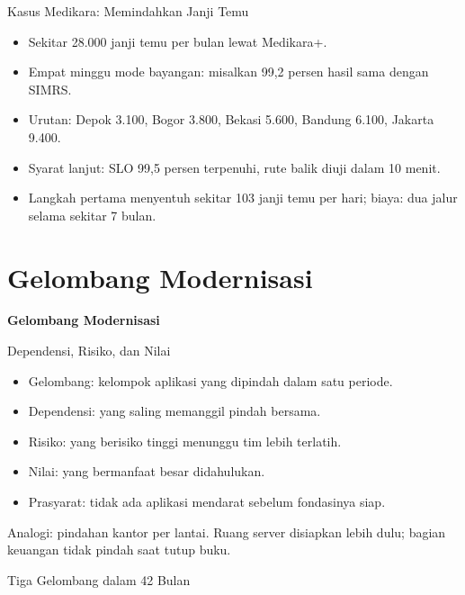 \documentclass[aspectratio=169, table, 12pt]{beamer}
\begin{document}
\begin{frame}{{\Large Kasus Medikara: Memindahkan Janji Temu}}
  \vspace{10pt}
  \begin{itemize}
    \item Sekitar 28.000 janji temu per bulan lewat Medikara+.
    \item Empat minggu mode bayangan: misalkan 99,2 persen hasil sama dengan SIMRS.
    \item Urutan: Depok 3.100, Bogor 3.800, Bekasi 5.600, Bandung 6.100, Jakarta 9.400.
    \item Syarat lanjut: SLO 99,5 persen terpenuhi, rute balik diuji dalam 10 menit.
    \item Langkah pertama menyentuh sekitar 103 janji temu per hari; biaya: dua jalur selama sekitar
          7 bulan.
  \end{itemize}
\end{frame}

\section{Gelombang Modernisasi}

\begin{frame}{\hfill}
  \centering
  \Huge{\textbf{Gelombang Modernisasi}}
\end{frame}

\begin{frame}{{\Large Dependensi, Risiko, dan Nilai}}
  \vspace{10pt}
  \begin{itemize}
    \item Gelombang: kelompok aplikasi yang dipindah dalam satu periode.
    \item Dependensi: yang saling memanggil pindah bersama.
    \item Risiko: yang berisiko tinggi menunggu tim lebih terlatih.
    \item Nilai: yang bermanfaat besar didahulukan.
    \item Prasyarat: tidak ada aplikasi mendarat sebelum fondasinya siap.
  \end{itemize}
  \vspace{6pt}
  {\small Analogi: pindahan kantor per lantai. Ruang server disiapkan lebih dulu; bagian keuangan
  tidak pindah saat tutup buku.}
\end{frame}

\begin{frame}{{\Large Tiga Gelombang dalam 42 Bulan}}
  \centering
\end{frame}
\end{document}
